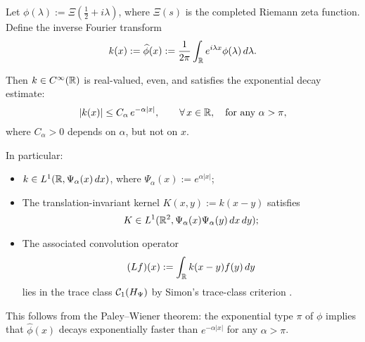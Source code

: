 \begin{lemma}
\label{lem:decay_inverse_fourier_xi}
Let \( \phi(\lambda) := \Xi\left( \tfrac{1}{2} + i\lambda \right) \), where \( \Xi(s) \) is the completed Riemann zeta function. Define the inverse Fourier transform
\[
k(x) := \widehat{\phi}(x) := \frac{1}{2\pi} \int_{\mathbb{R}} e^{i\lambda x} \phi(\lambda)\, d\lambda.
\]

Then \( k \in C^\infty(\mathbb{R}) \) is real-valued, even, and satisfies the exponential decay estimate:
\[
|k(x)| \le C_\alpha\, e^{-\alpha |x|}, \qquad \forall\, x \in \mathbb{R}, \quad \text{for any } \alpha > \pi,
\]
where \( C_\alpha > 0 \) depends on \( \alpha \), but not on \( x \).

\medskip
\noindent In particular:
\begin{itemize}
    \item \( k \in L^1(\mathbb{R}, \Psi_\alpha(x)\, dx) \), where \( \Psi_\alpha(x) := e^{\alpha |x|} \);
    \item The translation-invariant kernel \( K(x,y) := k(x - y) \) satisfies
    \[
    K \in L^1(\mathbb{R}^2, \Psi_\alpha(x)\Psi_\alpha(y)\, dx\, dy);
    \]
    \item The associated convolution operator
    \[
    (Lf)(x) := \int_{\mathbb{R}} k(x - y) f(y)\, dy
    \]
    lies in the trace class \( \mathcal{C}_1(H_{\Psi}) \) by Simon’s trace-class criterion \cite[Thm.~4.2]{Simon2005TraceIdeals}.
\end{itemize}

\medskip
\noindent
This follows from the Paley--Wiener theorem: the exponential type \( \pi \) of \( \phi \) implies that \( \widehat{\phi}(x) \) decays exponentially faster than \( e^{-\alpha |x|} \) for any \( \alpha > \pi \).
\end{lemma}
